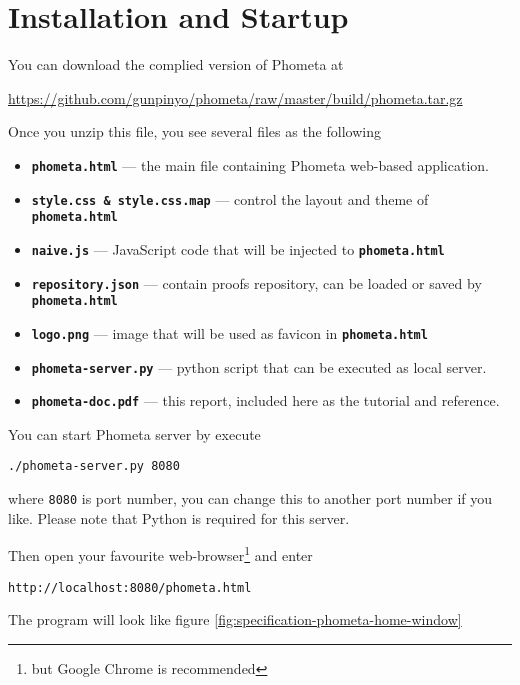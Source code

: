 \documentclass[master.tex]{subfiles}
\begin{document}
\chapter{Installation and Startup}
\label{chap:installation_startup}

You can download the complied version of Phometa at

{\centering\url{https://github.com/gunpinyo/phometa/raw/master/build/phometa.tar.gz}}

Once you unzip this file, you see several files as the following

\begin{itemize}
\item \texttt{\textbf{phometa.html}} --- the main file containing Phometa
  web-based application.
\item \texttt{\textbf{style.css \& style.css.map}} --- control the layout and
  theme of \texttt{\textbf{phometa.html}}
\item \texttt{\textbf{naive.js}} --- JavaScript code that will be injected to
  \texttt{\textbf{phometa.html}}
\item \texttt{\textbf{repository.json}} --- contain proofs repository, can be
  loaded or saved by \texttt{\textbf{phometa.html}}
\item \texttt{\textbf{logo.png}} --- image that will be used as favicon in
  \texttt{\textbf{phometa.html}}
\item \texttt{\textbf{phometa-server.py}} --- python script that can be executed
  as local server.
\item \texttt{\textbf{phometa-doc.pdf}} --- this report, included here as the
  tutorial and reference.
\end{itemize}

You can start Phometa server by execute

\texttt{./phometa-server.py 8080}

where \texttt{8080} is port number, you can change this to another port number
if you like. Please note that Python is required for this server.

Then open your favourite web-browser\footnote{but Google Chrome is recommended}
and enter

\texttt{http://localhost:8080/phometa.html}

The program will look like figure \ref{fig:specification-phometa-home-window}
\end{document}
